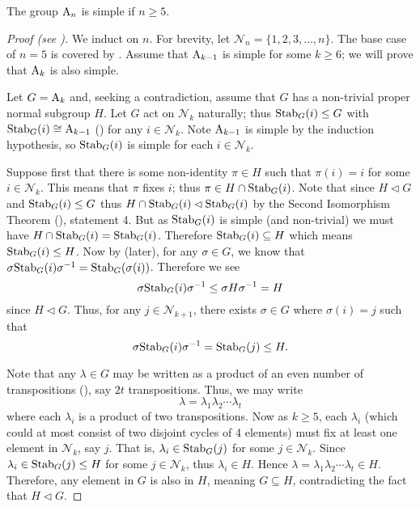 \begin{theorem}\label{thrm-An-is-simple-for-n>=5}
    The group $\mathrm{A}_{n}$ is simple if $n \geq 5$.
\end{theorem}
\begin{proof}[Proof (see {\cite[Theorem 4.24]{dummit_foote_2004}})]
    We induct on $n$. For brevity, let $\mathcal{N}_n = \{1, 2, 3, \dots, n\}$. The base case of $n = 5$ is covered by . Assume that $\mathrm{A}_{k-1}$ is simple for some $k \geq 6$; we will prove that $\mathrm{A}_{k}$ is also simple.

    Let $G = \mathrm{A}_{k}$ and, seeking a contradiction, assume that $G$ has a non-trivial proper normal subgroup $H$. Let $G$ act on $\mathcal{N}_{k}$ naturally; thus $\mathrm{Stab}_{G}(i) \leq G$ with $\mathrm{Stab}_{G}(i) \cong \mathrm{A}_{k-1}$ () for any $i \in \mathcal{N}_k$. Note $\mathrm{A}_{k-1}$ is simple by the induction hypothesis, so $\mathrm{Stab}_{G}(i)$ is simple for each $i \in \mathcal{N}_{k}$.

    Suppose first that there is some non-identity $\pi \in H$ such that $\pi(i) = i$ for some $i \in \mathcal{N}_{k}$. This means that $\pi$ fixes $i$; thus $\pi \in H \cap \mathrm{Stab}_{G}(i)$. Note that since $H \lhd G$ and $\mathrm{Stab}_{G}(i) \leq G$ thus $H \cap \mathrm{Stab}_{G}(i) \lhd \mathrm{Stab}_{G}(i)$ by the Second Isomorphism Theorem (), statement 4. But as $\mathrm{Stab}_{G}(i)$ is simple (and non-trivial) we must have $H \cap \mathrm{Stab}_{G}(i) = \mathrm{Stab}_{G}(i)$. Therefore $\mathrm{Stab}_{G}(i) \subseteq H$ which means $\mathrm{Stab}_{G}(i) \leq H$. Now by  (later), for any $\sigma \in G$, we know that $\sigma\mathrm{Stab}_{G}(i)\sigma^{-1} = \mathrm{Stab}_{G}(\sigma(i))$. Therefore we see
    \[
        \sigma\mathrm{Stab}_{G}(i)\sigma^{-1} \leq \sigma H\sigma^{-1} = H
    \]
    since $H \lhd G$. Thus, for any $j \in \mathcal{N}_{k+1}$, there exists $\sigma \in G$ where $\sigma(i) = j$ such that
    \[
        \sigma\mathrm{Stab}_{G}(i)\sigma^{-1} = \mathrm{Stab}_{G}(j) \leq H.
    \]

    Note that any $\lambda \in G$ may be written as a product of an even number of transpositions (), say $2t$ transpositions. Thus, we may write
    \[
        \lambda = \lambda_1\lambda_2\cdots\lambda_t
    \]
    where each $\lambda_i$ is a product of two transpositions. Now as $k \geq 5$, each $\lambda_i$ (which could at most consist of two disjoint cycles of 4 elements) must fix at least one element in $\mathcal{N}_{k}$, say $j$. That is, $\lambda_i \in \mathrm{Stab}_{G}(j)$ for some $j \in \mathcal{N}_{k}$. Since $\lambda_i \in \mathrm{Stab}_{G}(j) \leq H$ for some $j \in \mathcal{N}_{k}$, thus $\lambda_i \in H$. Hence $\lambda = \lambda_1\lambda_2\cdots\lambda_t \in H$. Therefore, any element in $G$ is also in $H$, meaning $G \subseteq H$, contradicting the fact that $H \lhd G$.


\end{proof}
